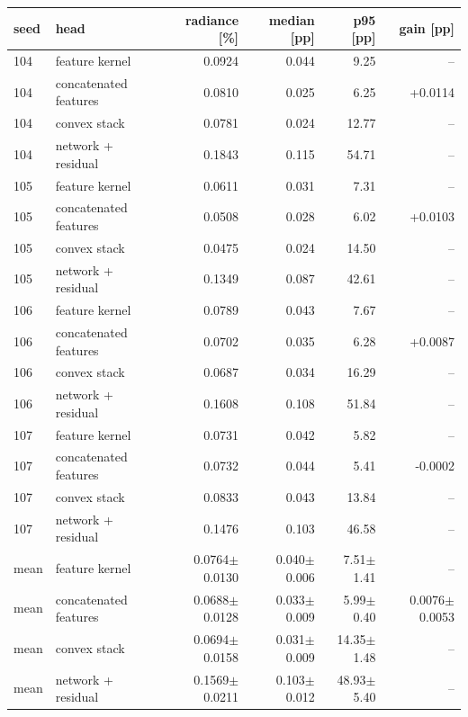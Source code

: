 {\fontsize{9}{11}\selectfont
\setlength{\tabcolsep}{2.8pt}
\begin{tabular}{llrrrr}
\toprule
seed & head & radiance [\%] & median [pp] & p95 [pp] & gain [pp] \\
\midrule
104 & feature kernel & 0.0924 & 0.044 & 9.25 & -- \\
104 & concatenated features & 0.0810 & 0.025 & 6.25 & +0.0114 \\
104 & convex stack & 0.0781 & 0.024 & 12.77 & -- \\
104 & network + residual & 0.1843 & 0.115 & 54.71 & -- \\
105 & feature kernel & 0.0611 & 0.031 & 7.31 & -- \\
105 & concatenated features & 0.0508 & 0.028 & 6.02 & +0.0103 \\
105 & convex stack & 0.0475 & 0.024 & 14.50 & -- \\
105 & network + residual & 0.1349 & 0.087 & 42.61 & -- \\
106 & feature kernel & 0.0789 & 0.043 & 7.67 & -- \\
106 & concatenated features & 0.0702 & 0.035 & 6.28 & +0.0087 \\
106 & convex stack & 0.0687 & 0.034 & 16.29 & -- \\
106 & network + residual & 0.1608 & 0.108 & 51.84 & -- \\
107 & feature kernel & 0.0731 & 0.042 & 5.82 & -- \\
107 & concatenated features & 0.0732 & 0.044 & 5.41 & -0.0002 \\
107 & convex stack & 0.0833 & 0.043 & 13.84 & -- \\
107 & network + residual & 0.1476 & 0.103 & 46.58 & -- \\
mean & feature kernel & 0.0764$\pm$0.0130 & 0.040$\pm$0.006 & 7.51$\pm$1.41 & -- \\
mean & concatenated features & 0.0688$\pm$0.0128 & 0.033$\pm$0.009 & 5.99$\pm$0.40 & 0.0076$\pm$0.0053 \\
mean & convex stack & 0.0694$\pm$0.0158 & 0.031$\pm$0.009 & 14.35$\pm$1.48 & -- \\
mean & network + residual & 0.1569$\pm$0.0211 & 0.103$\pm$0.012 & 48.93$\pm$5.40 & -- \\
\bottomrule
\end{tabular}}
